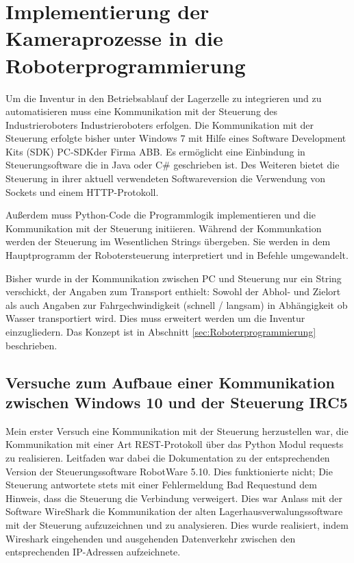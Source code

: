 \chapter{Implementierung der Kameraprozesse in die Roboterprogrammierung}

Um die Inventur in den Betriebsablauf der Lagerzelle zu integrieren und zu automatisieren muss eine Kommunikation mit der Steuerung des Industrieroboters Industrieroboters erfolgen. 
Die Kommunikation mit der Steuerung erfolgte bisher unter Windows 7 mit Hilfe eines Software Development Kits (SDK) \glq PC-SDK\grq der Firma ABB.
Es ermöglicht eine Einbindung in Steuerungsoftware die in Java oder C\# geschrieben ist. 
Des Weiteren bietet die Steuerung in ihrer aktuell verwendeten Softwareversion die Verwendung von Sockets und einem HTTP-Protokoll.

Außerdem muss Python-Code die Programmlogik implementieren und die Kommunikation mit der Steuerung initiieren. 
Während der Kommunkation werden der Steuerung im Wesentlichen Strings übergeben. 
Sie werden in dem Hauptprogramm der Robotersteuerung interpretiert und in Befehle umgewandelt.

Bisher wurde in der Kommunikation zwischen PC und Steuerung nur ein String verschickt, der Angaben zum Transport enthielt:
Sowohl der Abhol- und Zielort als auch Angaben zur Fahrgechwindigkeit (schnell / langsam) in Abhängigkeit ob Wasser transportiert wird.
Dies muss erweitert werden um die Inventur einzugliedern. Das Konzept ist in Abschnitt \ref{sec:Roboterprogrammierung} beschrieben.


\section{Versuche zum Aufbaue einer Kommunikation zwischen Windows 10 und der Steuerung IRC5}

Mein erster Versuch eine Kommunikation mit der Steuerung herzustellen war, die Kommunikation mit einer Art REST-Protokoll über das Python Modul \glq requests\grq{} zu realisieren.
Leitfaden war dabei die Dokumentation zu der entsprechenden Version der Steuerungssoftware RobotWare 5.10.
Dies funktionierte nicht; Die Steuerung antwortete stets mit einer Fehlermeldung  Bad Request\grq und dem Hinweis, dass die Steuerung die Verbindung verweigert.
Dies war Anlass mit der Software WireShark die Kommunikation der alten Lagerhausverwalungssoftware mit der Steuerung aufzuzeichnen und zu analysieren.
Dies wurde realisiert, indem Wireshark eingehenden und ausgehenden Datenverkehr zwischen den entsprechenden IP-Adressen aufzeichnete.

